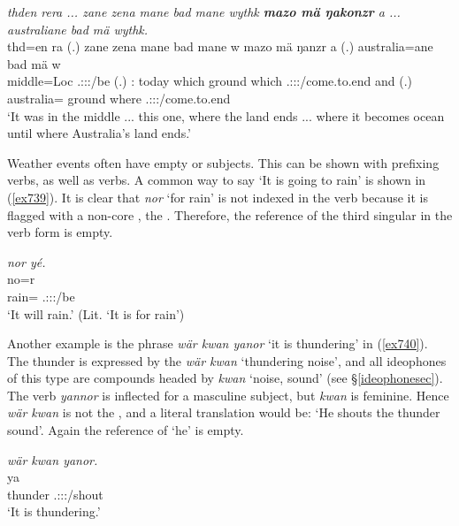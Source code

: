 \begin{exe}
	\ex \emph{thden rera ... zane zena mane bad mane wythk \textbf{mazo mä ŋakonzr} a ... australiane bad mä wythk.}\\
	\gll thd=en ra (.) zane zena mane bad mane w mazo mä ŋanzr a (.) australia=ane bad mä w\\
	middle=Loc{} \Tsg.\F:\Sbj:\Pst:\Ipfv/be (.) \Dem:\Prox{} today which ground which \Tsg.\F:\Sbj:\Nonpast:\Ipfv/come.to.end and (.) australia=\Poss{} ground where \Tsg.\F:\Sbj:\Nonpast:\Ipfv/come.to.end\\
	\trans `It was in the middle ... this one, where the land ends ... where it becomes ocean until where Australia's land ends.'
	\label{ex559}
\end{exe}

Weather events often have empty or  subjects. This can be shown with prefixing verbs, as well as  verbs. A common way to say `It is going to rain' is shown in (\ref{ex739}). It is clear that \emph{nor} `for rain' is not indexed in the verb because it is flagged with a non-core , the  . Therefore, the reference of the third singular in the verb form is empty.

\begin{exe}
	\ex \emph{nor yé.}\\
	\gll no=r \\
	rain=\Purp{} \Tsg.\Masc:\Sbj:\Nonpast:\Ipfv/be\\
	\trans `It will rain.' (Lit. `It is for rain')
	\label{ex739}
\end{exe}

Another example is the phrase \emph{wär kwan yanor} `it is thundering' in (\ref{ex740}). The thunder is expressed by the  \emph{wär kwan} `thundering noise', and all ideophones of this type are  compounds headed by \emph{kwan} `noise, sound' (see \S{}\ref{ideophonesec}). The verb \emph{yannor} is inflected for a masculine subject, but \emph{kwan} is feminine. Hence \emph{wär kwan} is not the , and a literal translation would be: `He shouts the thunder sound'. Again the reference of `he' is empty.

\begin{exe}
	\ex \emph{wär kwan yanor.}\\
	 ya\\
	thunder \Tsg.\Masc:\Sbj:\Nonpast:\Ipfv/shout\\
	\trans `It is thundering.'
	\label{ex740}
\end{exe}

